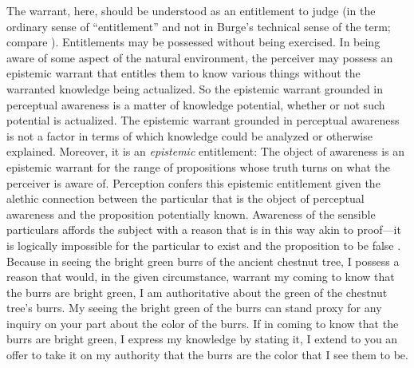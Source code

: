 The warrant, here, should be understood as an entitlement to judge (in the ordinary sense of ``entitlement'' and not in Burge's \citeyear{Burge:2003fk} technical sense of the term; compare \citealt[132n]{McDowell:2009ys}). Entitlements may be possessed without being exercised. In being aware of some aspect of the natural environment, the perceiver may possess an epistemic warrant that entitles them to know various things without the warranted knowledge being actualized. So the epistemic warrant grounded in perceptual awareness is a matter of knowledge potential, whether or not such potential is actualized. The epistemic warrant grounded in perceptual awareness is not a factor in terms of which knowledge could be analyzed or otherwise explained. Moreover, it is an \emph{epistemic} entitlement: The object of awareness is an epistemic warrant for the range of propositions whose truth turns on what the perceiver is aware of. Perception confers this epistemic entitlement given the alethic connection between the particular that is the object of perceptual awareness and the proposition potentially known. Awareness of the sensible particulars affords the subject with a reason that is in this way akin to proof---it is logically impossible for the particular to exist and the proposition to be false \citep[see][]{Cook-Wilson:1926sf,Kalderon:2010fk,Travis:2005kx}. Because in seeing the bright green burrs of the ancient chestnut tree, I possess a reason that would, in the given circumstance, warrant my coming to know that the burrs are bright green, I am authoritative about the green of the chestnut tree's burrs. My seeing the bright green of the burrs can stand proxy for any inquiry on your part about the color of the burrs. If in coming to know that the burrs are bright green, I express my knowledge by stating it, I extend to you an offer to take it on my authority that the burrs are the color that I see them to be. 

